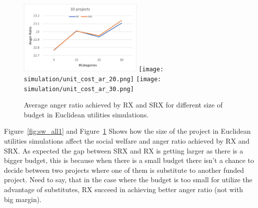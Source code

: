 \documentclass[runningheads]{llncs}
\begin{document}
\begin{subappendices}
\begin{figure}[t]
\begin{center}
\includegraphics[width=6cm]{simulation/unit_cost_ar_10.png}
\texttt{[image: simulation/unit\_cost\_ar\_20.png]}
\texttt{[image: simulation/unit\_cost\_ar\_30.png]}
\caption{Average anger ratio achieved by RX and SRX for different size of budget in Euclidean utilities simulations.
}\label{fig:ar_all1}
\end{center}
\end{figure}



Figure~\ref{fig:sw_all1} and Figure~\ref{fig:ar_all1} Shows how the size of the project in Euclidean utilities simulations affect the social welfare and anger ratio achieved by RX and SRX. As expected the gap between SRX and RX is getting larger as there is a bigger budget, this is because when there is a small budget there isn't a chance to decide between two projects where one of them is substitute to another funded project. Need to say, that in the case where the budget is too small for utilize the advantage of substitutes, RX succeed in achieving better anger ratio (not with big margin).


\end{subappendices}
\end{document}
